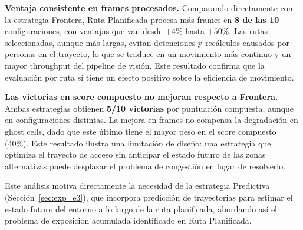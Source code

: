 \textbf{Ventaja consistente en frames procesados.} Comparando directamente con la estrategia Frontera, Ruta Planificada procesa más frames en \textbf{8 de las 10} configuraciones, con ventajas que van desde $+4\%$ hasta $+50\%$. Las rutas seleccionadas, aunque más largas, evitan detenciones y recálculos causados por personas en el trayecto, lo que se traduce en un movimiento más continuo y un mayor throughput del pipeline de visión. Este resultado confirma que la evaluación por ruta sí tiene un efecto positivo sobre la eficiencia de movimiento.

\textbf{Las victorias en score compuesto no mejoran respecto a Frontera.} Ambas estrategias obtienen \textbf{5/10 victorias} por puntuación compuesta, aunque en configuraciones distintas. La mejora en frames no compensa la degradación en ghost cells, dado que este último tiene el mayor peso en el score compuesto (40\%). Este resultado ilustra una limitación de diseño: una estrategia que optimiza el trayecto de acceso sin anticipar el estado futuro de las zonas alternativas puede desplazar el problema de congestión en lugar de resolverlo.

Este análisis motiva directamente la necesidad de la estrategia Predictiva (Sección~\ref{sec:exp_e3}), que incorpora predicción de trayectorias para estimar el estado futuro del entorno a lo largo de la ruta planificada, abordando así el problema de exposición acumulada identificado en Ruta Planificada.
